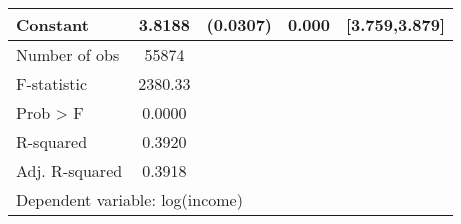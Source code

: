 {\begin{tabular}{l*{1}{cccc}}
Constant            &      3.8188&    (0.0307)&       0.000&[3.759,3.879]\\
\midrule
Number of obs       &       55874&            &            &            \\
F-statistic         &     2380.33&            &            &            \\
Prob > F            &      0.0000&            &            &            \\
R-squared           &      0.3920&            &            &            \\
Adj. R-squared      &      0.3918&            &            &            \\
\bottomrule
\multicolumn{5}{l}{\footnotesize Dependent variable: log(income)}\\
\end{tabular}
}
